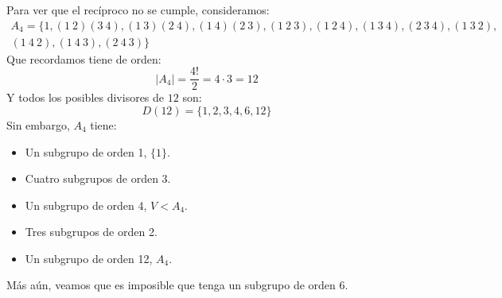 \begin{ejemplo}
    Para ver que el recíproco no se cumple, consideramos:
    \begin{multline*}
        A_4 = \{1, (1\ 2)(3\ 4), (1\ 3)(2\ 4), (1\ 4)(2\ 3), (1\ 2\ 3), (1\ 2\ 4), (1\ 3\ 4), (2\ 3\ 4), (1\ 3\ 2),\\ (1\ 4\ 2), (1\ 4\ 3), (2\ 4\ 3)\}
    \end{multline*}
    Que recordamos tiene de orden:
    \begin{equation*}
        |A_4| = \dfrac{4!}{2} = 4\cdot 3 = 12
    \end{equation*}
    Y todos los posibles divisores de $12$ son:
    \begin{equation*}
        D(12) = \{1, 2, 3, 4, 6, 12\}
    \end{equation*}
    Sin embargo, $A_4$ tiene:
    \begin{itemize}
        \item Un subgrupo de orden 1, $\{1\}$.
        \item Cuatro subgrupos de orden 3.
        \item Un subgrupo de orden 4, $V < A_4$.
        \item Tres subgrupos de orden 2.
        \item Un subgrupo de orden 12, $A_4$.
    \end{itemize}
    Más aún, veamos que es imposible que tenga un subgrupo de orden 6.


\end{ejemplo}
